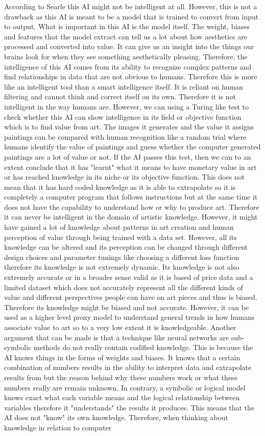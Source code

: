 \documentclass{article}
\begin{document}
According to Searle this AI might not be intelligent at all. However, this is not a drawback as this AI is meant to be a model that is trained to convert from input to output. What is important in this AI is the model itself. The weight, biases and features that the model extract can tell us a lot about how aesthetics are processed and converted into value. It can give us an insight into the things our brains look for when they see something aesthetically pleasing. Therefore, the intelligence of this AI comes from its ability to recognize complex patterns and find relationships in data that are not obvious to humans. Therefore this is more like an intelligent tool than a smart intelligence itself. It is reliant on human filtering and cannot think and correct itself on its own. Therefore it is not intelligent in the way humans are. However, we can using a Turing like test to check whether this AI can show intelligence in its field or objective function which is to find value from art. The images it generates and the value it assigns paintings can be compared with human recognition like a random trial where humans identify the value of paintings and guess whether the computer generated paintings are a lot of value or not. If the AI passes this test, then we can to an extent conclude that it has "learnt" what it means to have monetary value in art or has reached knowledge in its niche or its objective function. This does not mean that it has hard coded knowledge as it is able to extrapolate so it is completely a computer program that follows instructions but at the same time it does not have the capability to understand how or why to produce art. Therefore it can never be intelligent in the domain of artistic knowledge. However, it might have gained a lot of knowledge about patterns in art creation and human perception of value through being trained with a data set. However, all its knowledge can be altered and its perception can be changed through different design choices and parameter tunings like choosing a different loss function therefore its knowledge is not extremely dynamic. Its knowledge is not also extremely accurate or in a broader sense valid as it is based of price data and a limited dataset which does not accurately represent all the different kinds of value and different perspectives people can have on art pieces and thus is biased. Therefore its knowledge might be biased and not accurate. However, it can be used as a higher level proxy model to understand general trends in how humans associate value to art so to a very low extent it is knowledgeable. Another argument that can be made is that a technique like neural networks are sub-symbolic methods do not really contain codified knowledge. This is because the AI knows things in the forms of weights and biases. It knows that a certain combination of numbers results in the ability to interpret data and extrapolate results from but the reason behind why these numbers work or what these numbers really are remain unknown. In contrary, a symbolic or logical model knows exact what each variable means and the logical relationship between variables therefore it "understands" the results it produces. This means that the AI does not "know" its own knowledge. Therefore, when thinking about knowledge in relation to computer 
\end{document}
